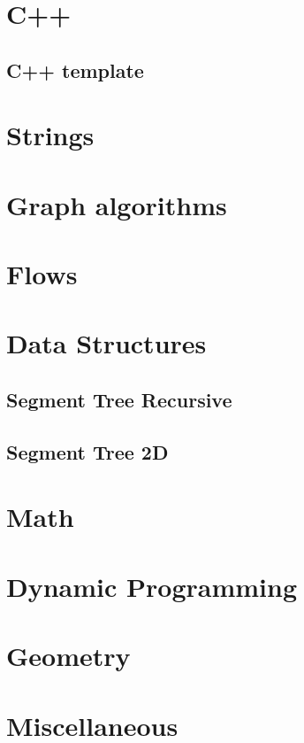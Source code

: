 \section{C++}
\subsection{C++ template}
\raggedbottom
\hrulefill

\section{Strings}

\section{Graph algorithms}

\section{Flows}

\section{Data Structures}
\subsection{Segment Tree Recursive}
\raggedbottom
\hrulefill
\subsection{Segment Tree 2D}
\raggedbottom
\hrulefill

\section{Math}

\section{Dynamic Programming}

\section{Geometry}

\section{Miscellaneous}

